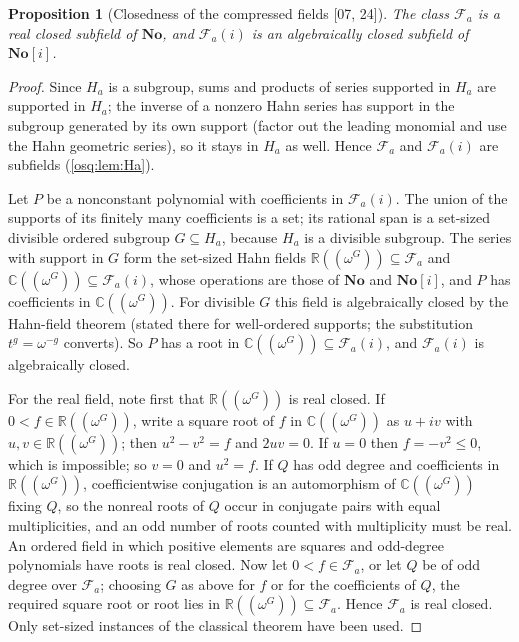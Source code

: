 \documentclass[11pt,letterpaper]{article}
\numberwithin{equation}{section}
\newtheorem{proposition}[proposition]{Proposition}
\theoremstyle{definition}
\theoremstyle{remark}
\theoremstyle{plain}
\newcommand{\No}{\mathbf{No}}
\newcommand{\SC}{\No[i]}
\newcommand{\R}{\mathbb R}
\newcommand{\C}{\mathbb C}
\newcommand{\FF}{\mathscr F}         %
\newcommand{\src}[1]{\textup{\textsf{[#1]}}}
\begin{document}
\begin{proposition}[Closedness of the compressed fields \src{07, 24}]\label{osq:if:prop:closed}
The class $\FF_a$ is a real closed subfield of $\No$, and $\FF_a(i)$ is an algebraically
closed subfield of $\SC$.
\end{proposition}

\begin{proof}
Since $H_a$ is a subgroup, sums and products of series supported in $H_a$ are supported
in $H_a$; the inverse of a nonzero Hahn series has support in the subgroup generated by
its own support (factor out the leading monomial and use the Hahn geometric series), so
it stays in $H_a$ as well. Hence $\FF_a$ and $\FF_a(i)$ are subfields
(\cref{osq:lem:Ha}).

Let $P$ be a nonconstant polynomial with coefficients in $\FF_a(i)$. The union of the
supports of its finitely many coefficients is a set; its rational span is a set-sized
divisible ordered subgroup $G\subseteq H_a$, because $H_a$ is a divisible subgroup. The
series with support in $G$ form the set-sized Hahn fields $\R(\!(\omega^G)\!)\subseteq
\FF_a$ and $\C(\!(\omega^G)\!)\subseteq\FF_a(i)$, whose operations are those of $\No$ and
$\SC$, and $P$ has coefficients in $\C(\!(\omega^G)\!)$. For divisible $G$ this field is
algebraically closed by the Hahn-field theorem \cite[Corollary~4]{Poonen} (stated there
for well-ordered supports; the substitution $t^g=\omega^{-g}$ converts). So $P$ has a root
in $\C(\!(\omega^G)\!)\subseteq\FF_a(i)$, and $\FF_a(i)$ is algebraically closed.

For the real field, note first that $\R(\!(\omega^G)\!)$ is real closed. If
$0<f\in\R(\!(\omega^G)\!)$, write a square root of $f$ in $\C(\!(\omega^G)\!)$ as $u+iv$
with $u,v\in\R(\!(\omega^G)\!)$; then $u^2-v^2=f$ and $2uv=0$. If $u=0$ then
$f=-v^2\le0$, which is impossible; so $v=0$ and $u^2=f$. If $Q$ has odd degree and
coefficients in $\R(\!(\omega^G)\!)$, coefficientwise conjugation is an automorphism of
$\C(\!(\omega^G)\!)$ fixing $Q$, so the nonreal roots of $Q$ occur in conjugate pairs
with equal multiplicities, and an odd number of roots counted with multiplicity must be
real. An ordered field in which positive elements are squares and odd-degree polynomials
have roots is real closed. Now let $0<f\in\FF_a$, or let $Q$ be of odd degree over
$\FF_a$; choosing $G$ as above for $f$ or for the coefficients of $Q$, the required square
root or root lies in $\R(\!(\omega^G)\!)\subseteq\FF_a$. Hence $\FF_a$ is real closed.
Only set-sized instances of the classical theorem have been used.
\end{proof}
\end{document}
